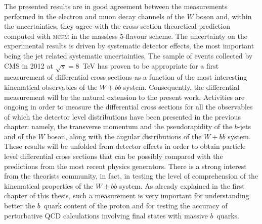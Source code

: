 The presented results are in good agreement between the measurements performed
in the electron and muon decay channels of the $W$ boson and, within the 
uncertainties, they agree with the cross section theoretical 
prediction computed with \textsc{mcfm} in the massless 5-flavour scheme.
The uncertainty on the experimental results is driven by systematic detector effects,
the most important being the jet related systematic uncertainties.
The sample of events collected by CMS in 2012 at $\sqrt{s}=8$~TeV has proven to be 
appropriate for a first measurement of differential cross sections as a function of the 
most interesting kinematical observables of the $W+bb$ system. 
Consequently, the differential measurement will be the natural extension to the present 
work. Activities are ongoing in order to measure the differential cross 
sections for all the observables of which the detector level distributions have been 
presented in the previous chapter: namely, the transverse momentum and the pseudorapidity of 
the $b$-jets and of the $W$ boson, along with the angular distributions of the 
$W+bb$ system. These results will be unfolded from detector effects in order 
to obtain particle level differential cross sections that can be possibly compared with 
the predictions from the most recent physics generators.
There is a strong interest from the theorists community, in fact, in testing the 
level of comprehension of the kinematical properties of the $W+bb$ system.
As already explained in the first chapter of this thesis, such a measurement 
is very important for understanding better the $b$~quark content of the proton and for 
testing the accuracy of perturbative QCD calculations involving final states 
with massive $b$~quarks.
